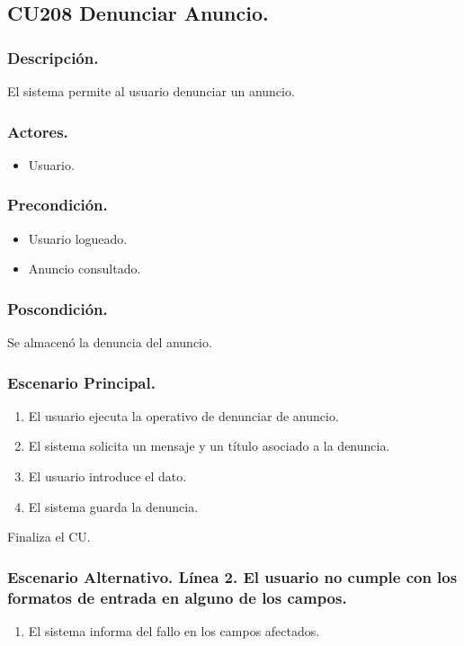 \subsection{CU208 Denunciar Anuncio.}
\subsubsection{Descripci\'{o}n.}
El sistema permite al usuario denunciar un anuncio.
\subsubsection{Actores.}
\begin{itemize}
\item Usuario.
\end{itemize}
\subsubsection{Precondici\'{o}n.}
\begin{itemize}
\item Usuario logueado.
\item Anuncio consultado.
\end{itemize}
\subsubsection{Poscondici\'{o}n.}
Se almacen\'{o} la denuncia del anuncio.
\subsubsection{Escenario Principal.}
\begin{enumerate}
\item El usuario ejecuta la operativo de denunciar de anuncio.
\item El sistema solicita un mensaje y un t\'{i}tulo asociado a la denuncia.
\item El usuario introduce el dato.
\item El sistema guarda la denuncia.
\end{enumerate}
Finaliza el CU.
\subsubsection{Escenario Alternativo. L\'{i}nea 2. El usuario no cumple con los formatos de entrada en alguno de los campos.}
\begin{enumerate}
\item El sistema informa del fallo en los campos afectados.
\end{enumerate}

